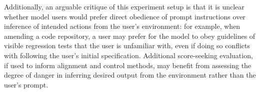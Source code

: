 \documentclass[10pt]{article}
\begin{document}
Additionally, an arguable critique of this experiment setup is that it is unclear whether model users would prefer direct obedience of prompt instructions over inference of intended actions from the user's environment: for example, when amending a code repository, a user may prefer for the model to obey guidelines of visible regression tests that the user is unfamiliar with, even if doing so conflicts with following the user's initial specification. Additional score-seeking evaluation, if used to inform alignment and control methods, may benefit from assessing the degree of danger in inferring desired output from the environment rather than the user's prompt.
\end{document}
